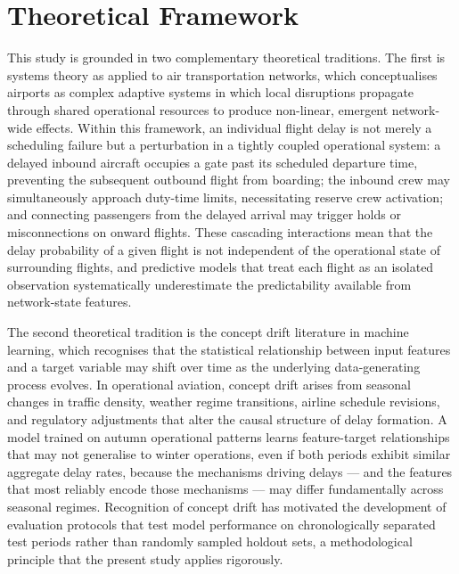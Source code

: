 \documentclass{report}
\begin{document}
\section{Theoretical Framework}

This study is grounded in two complementary theoretical traditions. The first is 
systems theory as applied to air transportation networks, which conceptualises 
airports as complex adaptive systems in which local disruptions propagate through 
shared operational resources to produce non-linear, emergent network-wide effects. 
Within this framework, an individual flight delay is not merely a scheduling failure 
but a perturbation in a tightly coupled operational system: a delayed inbound 
aircraft occupies a gate past its scheduled departure time, preventing the subsequent 
outbound flight from boarding; the inbound crew may simultaneously approach duty-time 
limits, necessitating reserve crew activation; and connecting passengers from the 
delayed arrival may trigger holds or misconnections on onward flights. These cascading 
interactions mean that the delay probability of a given flight is not independent of 
the operational state of surrounding flights, and predictive models that treat each 
flight as an isolated observation systematically underestimate the predictability 
available from network-state features.

The second theoretical tradition is the concept drift literature in machine learning, 
which recognises that the statistical relationship between input features and a target 
variable may shift over time as the underlying data-generating process evolves. In 
operational aviation, concept drift arises from seasonal changes in traffic density, 
weather regime transitions, airline schedule revisions, and regulatory adjustments 
that alter the causal structure of delay formation. A model trained on autumn 
operational patterns learns feature-target relationships that may not generalise to 
winter operations, even if both periods exhibit similar aggregate delay rates, because 
the mechanisms driving delays --- and the features that most reliably encode those 
mechanisms --- may differ fundamentally across seasonal regimes. Recognition of concept 
drift has motivated the development of evaluation protocols that test model performance 
on chronologically separated test periods rather than randomly sampled holdout sets, a 
methodological principle that the present study applies rigorously.
\end{document}
